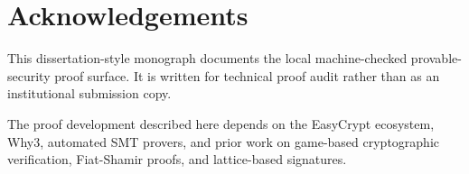 \chapter*{Acknowledgements}

This dissertation-style monograph documents the local machine-checked
\haetae{} provable-security proof surface.  It is written for technical proof
audit rather than as an institutional submission copy.

The proof development described here depends on the EasyCrypt ecosystem, Why3,
automated SMT provers, and prior work on game-based cryptographic verification,
Fiat-Shamir proofs, and lattice-based signatures.

\cleardoublepage
